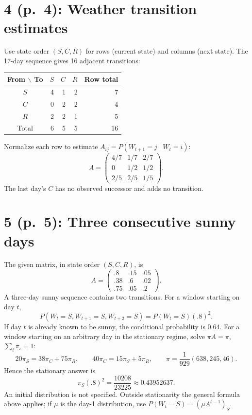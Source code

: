 \documentclass[11pt,a4paper]{article}
\begin{document}
\section*{4 (p.\ 4): Weather transition estimates}
Use state order $(S,C,R)$ for rows (current state) and columns (next state).
The 17-day sequence gives 16 adjacent transitions:
\begin{center}
\begin{tabular}{c|rrr|r}
\toprule
From $\backslash$ To & $S$ & $C$ & $R$ & Row total\\
\midrule
$S$&4&1&2&7\\
$C$&0&2&2&4\\
$R$&2&2&1&5\\
\midrule
Total&6&5&5&16\\
\bottomrule
\end{tabular}
\end{center}
Normalize each row to estimate $A_{ij}=P(W_{t+1}=j\mid W_t=i)$:
\[
 \boxed{A=\begin{pmatrix}4/7&1/7&2/7\\0&1/2&1/2\\2/5&2/5&1/5\end{pmatrix}}.
\]
The last day's $C$ has no observed successor and adds no transition.

\newpage
\section*{5 (p.\ 5): Three consecutive sunny days}
The given matrix, in state order $(S,C,R)$, is
\[
 A=\begin{pmatrix}.8&.15&.05\\.38&.6&.02\\.75&.05&.2\end{pmatrix}.
\]
A three-day sunny sequence contains two transitions. For a window starting
on day $t$,
\[
 \boxed{P(W_t=S,W_{t+1}=S,W_{t+2}=S)=P(W_t=S)(.8)^2}.
\]
If day $t$ is already known to be sunny, the conditional probability is $0.64$.
For a window starting on an arbitrary day in the stationary regime, solve
$\pi A=\pi$, $\sum_i\pi_i=1$:
\[
 20\pi_S=38\pi_C+75\pi_R,\qquad
 40\pi_C=15\pi_S+5\pi_R,
 \qquad
 \pi=\frac1{929}(638,245,46).
\]
Hence the stationary answer is
\[
 \boxed{\pi_S(.8)^2=\frac{10208}{23225}\approx0.43952637}.
\]
An initial distribution is not specified. Outside stationarity the general
formula above applies; if $\mu$ is the day-1 distribution, use
$P(W_t=S)=(\mu A^{t-1})_S$.
\end{document}
